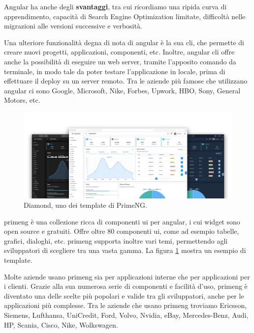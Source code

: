 Angular ha anche degli \textbf{svantaggi}, tra cui ricordiamo una ripida curva di apprendimento, capacità di Search Engine Optimization limitate, difficoltà nelle migrazioni alle versioni successive e verbosità.

Una ulteriore funzionalità degna di nota di \gls{angular} è la sua \acrfull{cli}, che permette di creare nuovi progetti, applicazioni, componenti, etc. Inoltre, \gls{angular} \acrshort{cli} offre anche la possibilità di eseguire un web server, tramite l'apposito comando da terminale, in modo tale da poter testare l'applicazione in locale, prima di effettuare il \gls{deploy} su un server remoto.
Tra le aziende più famose che utilizzano \gls{angular} ci sono Google, Microsoft, Nike, Forbes, Upwork, HBO, Sony, General Motors, etc.

\begin{figure}[H]
\centering
\includegraphics[width=1\textwidth]{Images/diamond.png}
\caption{\label{fig:diamond}Diamond, uno dei template di PrimeNG.}
\end{figure}
\acrfull{primeng} è una collezione ricca di componenti \acrshort{ui} per \gls{angular}, i cui widget sono \gls{open source} e gratuiti. Offre oltre 80 componenti \acrshort{ui}, come ad esempio tabelle, grafici, dialoghi, etc.
\acrshort{primeng} supporta inoltre vari temi, permettendo agli sviluppatori di scegliere tra una vasta gamma. La figura \ref{fig:diamond} mostra un esempio di template.

Molte aziende usano \acrshort{primeng} sia per applicazioni interne che per applicazioni per i clienti. Grazie alla sua numerosa serie di componenti e facilità d'uso, \acrshort{primeng} è diventato una delle scelte più popolari e valide tra gli sviluppatori, anche per le applicazioni più complesse. Tra le aziende che usano \acrshort{primeng} troviamo Ericsson, Siemens, Lufthansa, UniCredit, Ford, Volvo, Nvidia, eBay, Mercedes-Benz, Audi, HP, Scania, Cisco, Nike, Wolkswagen.

 
